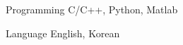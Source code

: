 
\begin{cvskills}

  \cvskill
    {Programming} %
    {C/C++, Python, Matlab} %

  \cvskill
    {Language} %
    {English, Korean} %



\end{cvskills}
